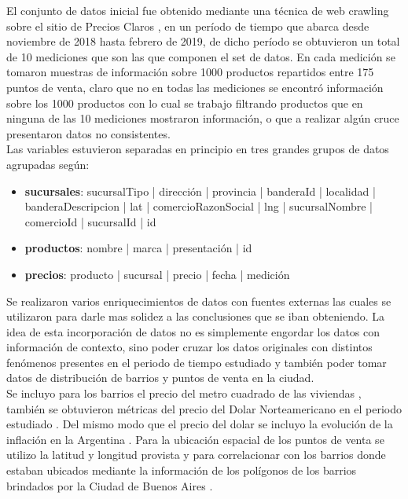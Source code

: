 
El conjunto de datos inicial fue obtenido mediante una técnica de web crawling sobre el sitio de Precios Claros \cite{preciosClaros},  en un período de tiempo que abarca desde noviembre de 2018 hasta febrero de 2019, de dicho período se obtuvieron un total de 10 mediciones que son las que componen el set de datos. En cada medición se tomaron muestras de información sobre 1000 productos repartidos entre 175 puntos de venta, claro que no en todas las mediciones se encontró información sobre los 1000 productos con lo cual se trabajo filtrando productos que en ninguna de las 10 mediciones mostraron información, o que a realizar algún cruce presentaron datos no consistentes.\\
Las variables estuvieron separadas en principio en tres grandes grupos de datos agrupadas según:

\begin{itemize}
	\item \textbf{sucursales}: sucursalTipo | dirección | provincia | banderaId | localidad | banderaDescripcion | lat |  comercioRazonSocial | lng | sucursalNombre | comercioId | sucursalId | id 
    \item \textbf{productos}: nombre | marca | presentación | id 
    \item \textbf{precios}: producto | sucursal | precio | fecha | medición
\end{itemize}


Se realizaron varios enriquecimientos de datos con fuentes externas las cuales se utilizaron para darle mas solidez a las conclusiones que se iban obteniendo. 
La idea de esta incorporación de datos no es simplemente engordar los datos con información de contexto, sino poder cruzar los datos originales con distintos fenómenos presentes en el periodo de tiempo estudiado y también poder tomar datos de distribución de barrios y puntos de venta en la ciudad.\\
Se incluyo para los barrios el precio del metro cuadrado de las viviendas \cite{Properati}, también se obtuvieron métricas del precio del Dolar Norteamericano en el periodo estudiado \cite{cotDolar}. Del mismo modo que el precio del dolar se incluyo la evolución de la inflación en la Argentina \cite{indec}. 
Para la ubicación espacial de los puntos de venta se utilizo la latitud y longitud provista y para correlacionar con los barrios donde estaban ubicados mediante la información de los polígonos de los barrios brindados por la Ciudad de Buenos Aires \cite{barriosGeoJSON}.




